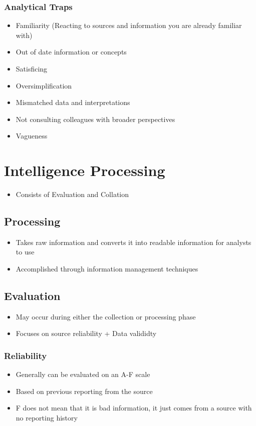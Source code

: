 \documentclass[11pt]{article}
\begin{document}
\subsubsection{Analytical Traps}
\label{sec:org57d6796}
\begin{itemize}
\item Familiarity (Reacting to sources and information you are already familiar with)
\item Out of date information or concepts
\item Satisficing
\item Oversimplification
\item Mismatched data and interpretations
\item Not consulting colleagues with broader perspectives
\item Vagueness
\end{itemize}
\section{Intelligence Processing}
\label{sec:org14371b4}
\begin{itemize}
\item Consists of Evaluation and Collation
\end{itemize}
\subsection{Processing}
\label{sec:org54a1bd1}
\begin{itemize}
\item Takes raw information and converts it into readable information for analysts to use
\item Accomplished through information management techniques
\end{itemize}
\subsection{Evaluation}
\label{sec:orgc372565}
\begin{itemize}
\item May occur during either the collection or processing phase
\item Focuses on source reliability + Data valididty
\end{itemize}
\subsubsection{Reliability}
\label{sec:orgee7ac7f}
\begin{itemize}
\item Generally can be evaluated on an A-F scale
\item Based on previous reporting from the source
\item F does not mean that it is bad information, it just comes from a source with no reporting history
\end{itemize}
\end{document}

